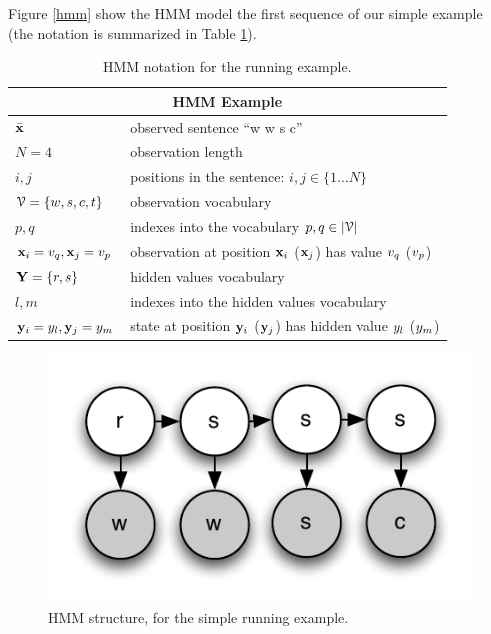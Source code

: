 Figure \ref{hmm} show the HMM model the first sequence of our simple
example (the notation is summarized in Table \ref{tab:hmm-simple-notation}).


\begin{table}[h]
\begin{center}
\begin{tabular}{|l|l|}
\hline
\multicolumn{2}{|c|}{HMM Example}\\
\hline
\hline
$\bar{\mathbf{x}}$ & observed sentence ``w w s c'' \\
\hline
$N = 4$ & observation length \\
\hline
$i,j$ & positions in the sentence: $i,j \in \{1 \ldots N\} $\\
\hline
$\mathcal{V} = \{w,s,c,t\}$ & observation vocabulary \\
\hline 
$p,q$ & indexes into the vocabulary $p,q \in |\mathcal{V}|$\\
\hline
$\mathbf{x}_i = {v}_q,\mathbf{x}_j = {v}_p$ & observation at position $\mathbf{x}_i$ ($\mathbf{x}_j$) has value ${v}_q$ (${v}_p$)\\
\hline 
$\mathbf{Y} = \{r,s\}$ & hidden values vocabulary\\
\hline 
$l,m$ & indexes into the hidden values vocabulary\\
\hline
$\mathbf{y}_i = {y}_l,\mathbf{y}_j = {y}_m$ & state at position $\mathbf{y}_i$ ($\mathbf{y}_j$) has hidden value ${y}_l$ (${y}_m$)\\
\hline
\end{tabular}
\end{center}
\caption[HMM notation]{\label{tab:hmm-simple-notation} HMM notation for the running example.}
\end{table}

\begin{figure}[ht]
\centering
\includegraphics[scale=1]{figs/sequences/hmm}
\caption[HMM running example]{\label{fig:hmm} HMM structure, for the simple
running example.}
\end{figure}


